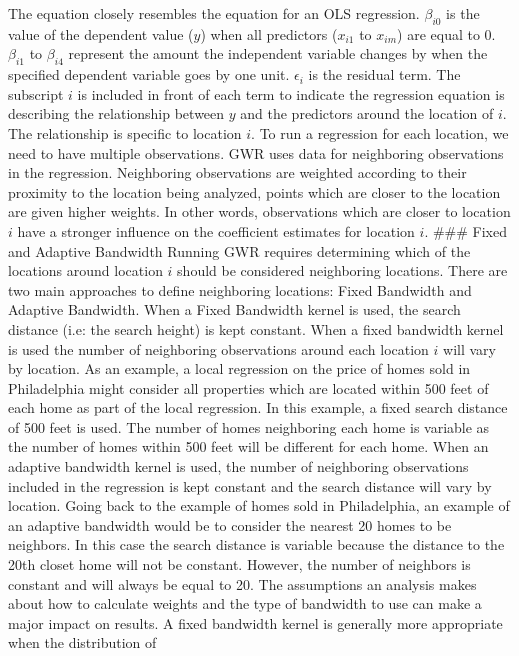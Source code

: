 \documentclass[
]{article}
\begin{document}
The equation closely resembles the equation for an OLS regression.
\({\beta}_{i0}\) is the value of the dependent value (\(y\)) when all
predictors (\({x}_{i1}\) to \(x_{im}\)) are equal to 0. \({\beta}_{i1}\)
to \({\beta}_{i4}\) represent the amount the independent variable
changes by when the specified dependent variable goes by one unit.
\(\epsilon_i\) is the residual term. The subscript \(i\) is included in
front of each term to indicate the regression equation is describing the
relationship between \(y\) and the predictors around the location of
\(i\). The relationship is specific to location \(i\). To run a
regression for each location, we need to have multiple observations. GWR
uses data for neighboring observations in the regression. Neighboring
observations are weighted according to their proximity to the location
being analyzed, points which are closer to the location are given higher
weights. In other words, observations which are closer to location \(i\)
have a stronger influence on the coefficient estimates for location
\(i\). \#\#\# Fixed and Adaptive Bandwidth Running GWR requires
determining which of the locations around location \(i\) should be
considered neighboring locations. There are two main approaches to
define neighboring locations: Fixed Bandwidth and Adaptive Bandwidth.
When a Fixed Bandwidth kernel is used, the search distance (i.e: the
search height) is kept constant. When a fixed bandwidth kernel is used
the number of neighboring observations around each location \(i\) will
vary by location. As an example, a local regression on the price of
homes sold in Philadelphia might consider all properties which are
located within 500 feet of each home as part of the local regression. In
this example, a fixed search distance of 500 feet is used. The number of
homes neighboring each home is variable as the number of homes within
500 feet will be different for each home. When an adaptive bandwidth
kernel is used, the number of neighboring observations included in the
regression is kept constant and the search distance will vary by
location. Going back to the example of homes sold in Philadelphia, an
example of an adaptive bandwidth would be to consider the nearest 20
homes to be neighbors. In this case the search distance is variable
because the distance to the 20th closet home will not be constant.
However, the number of neighbors is constant and will always be equal to
20. The assumptions an analysis makes about how to calculate weights and
the type of bandwidth to use can make a major impact on results. A fixed
bandwidth kernel is generally more appropriate when the distribution of
\end{document}
